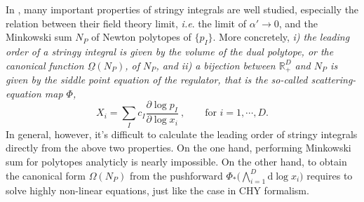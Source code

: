 \documentclass[12pt]{article}
\theoremstyle{definition}
\theoremstyle{plain}
\newcommand{\dif}{\mathrm{d}} %
\begin{document}

In \cite{Arkani-Hamed:2019mrd}, many important properties of stringy integrals are well studied, especially the relation between their field theory limit, {\it{i.e}}. the limit of $\alpha'\to 0$, and the Minkowski sum $N_{P}$ of Newton polytopes of $\{p_I\}$.
More concretely, {\it{ i) the leading order of a stringy integral is given by the volume of the dual polytope, or the canonical function $\underline{\Omega}(N_{P})$, of $N_{P}$, and ii) a bijection between $\mathds{R}_{+}^{D}$ and $N_{P}$ is given by the siddle point equation of the regulator, that is the so-called scattering-equation map $\Phi$,}}
\begin{equation} \label{SEmap}
	X_{i}= \sum_{I}c_{I}\frac{\partial \log p_{I}}{\partial \log x_{i}}\:, \qquad  \text{for }i=1,\cdots,D.
\end{equation}	
In general, however, it's difficult to calculate the leading order of stringy integrals directly from the above two properties.
On the one hand, performing Minkowski sum for polytopes analyticly is nearly impossible. On the other hand, to obtain the canonical form $\Omega(N_{P})$ from the pushforward $\Phi_{\ast}\bigl(\bigwedge_{i=1}^{D} \dif \log x_{i}\bigr)$ requires to solve highly non-linear equations, just like the case in CHY formalism.
\end{document}
